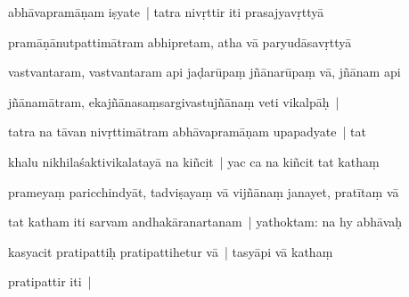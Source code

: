 \documentclass[article,12pt,a4paper]{memoir}%
\newcounter{parCount}
\begin{document}
	  \pstart \leavevmode%
	abhāvapramāṇam iṣyate | tatra nivṛttir iti prasajyavṛttyā 
	{}
	\pend%
      

	  \pstart \leavevmode%
	pramāṇānutpattimātram abhipretam, atha vā paryudāsavṛttyā 
	{}
	\pend%
      

	  \pstart \leavevmode%
	vastvantaram, vastvantaram api jaḍarūpaṃ jñānarūpaṃ vā, jñānam api 
	{}
	\pend%
      

	  \pstart \leavevmode%
	jñānamātram, ekajñānasaṃsargivastujñānaṃ veti vikalpāḥ | 
	{}
	\pend%
      

	  \pstart \leavevmode%
	\label{thakur75-28.22}tatra na tāvan nivṛttimātram abhāvapramāṇam upapadyate | tat 
	{}
	\pend%
      

	  \pstart \leavevmode%
	khalu nikhilaśaktivikalatayā na kiñcit | yac ca na kiñcit tat kathaṃ 
	{}
	\pend%
      

	  \pstart \leavevmode%
	prameyaṃ paricchindyāt, tadviṣayaṃ vā vijñānaṃ janayet, pratītaṃ vā 
	{}
	\pend%
      

	  \pstart \leavevmode%
	tat katham iti sarvam andhakāranartanam | yathoktam: na hy abhāvaḥ 
	{}
	\pend%
      

	  \pstart \leavevmode%
	kasyacit pratipattiḥ pratipattihetur vā | tasyāpi vā kathaṃ 
	{}
	\pend%
      

	  \pstart \leavevmode%
	pratipattir  iti |
	{}
	\pend%
      
\end{document}
